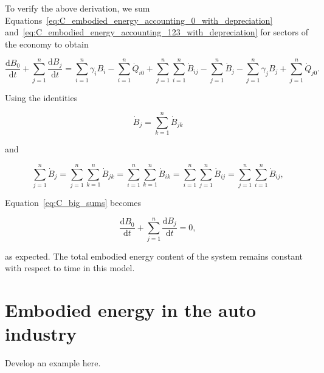 To verify the above derivation, 
we sum 
Equations~\ref{eq:C_embodied_energy_accounting_0_with_depreciation} 
and~\ref{eq:C_embodied_energy_accounting_123_with_depreciation} 
for sectors of the economy to obtain

\begin{equation} \label{eq:C_big_sums}
	\frac{\mathrm{d}B_{0}}{\mathrm{d}t} 
	+ \sum\limits_{j=1}^n \frac{\mathrm{d}B_{j}}{\mathrm{d}t} 
	= \sum\limits_{i=1}^n \gamma_{i} B_{i}
	- \sum\limits_{i=1}^n \dot{Q}_{i0}
	+ \sum\limits_{j=1}^n \sum\limits_{i=1}^n \dot{B}_{ij}
	- \sum\limits_{j=1}^n \dot{B}_{j}
	- \sum\limits_{j=1}^n \gamma_{j} B_{j}
	+ \sum\limits_{j=1}^n \dot{Q}_{j0}.
\end{equation}

\noindent{}Using the identities

\begin{equation} \label{eq:B_identity_1}
	\dot{B}_{j}  
	= \sum\limits_{k=1}^n \dot{B}_{jk}
\end{equation} 

\noindent and

\begin{equation} \label{eq:B_identity_2}
	\sum\limits_{j=1}^n\dot{B}_{j}  
	= \sum\limits_{j=1}^n \sum\limits_{k=1}^n \dot{B}_{jk}
	= \sum\limits_{i=1}^n \sum\limits_{k=1}^n \dot{B}_{ik}
	= \sum\limits_{i=1}^n \sum\limits_{j=1}^n \dot{B}_{ij}
	= \sum\limits_{j=1}^n \sum\limits_{i=1}^n \dot{B}_{ij},
\end{equation}

\noindent Equation~\ref{eq:C_big_sums} becomes

\begin{equation} \label{eq:C-B_sums_to_zero}
	\frac{\mathrm{d}B_{0}}{\mathrm{d}t} 
	+ \sum\limits_{j=1}^n \frac{\mathrm{d}B_{j}}{\mathrm{d}t} 
	= 0,
\end{equation}

\noindent as expected. The total embodied energy content of the system 
remains constant with respect to time in this model.


\section{Embodied energy in the auto industry}
\label{sec:embodied_energy_auto}

Develop an example here.


